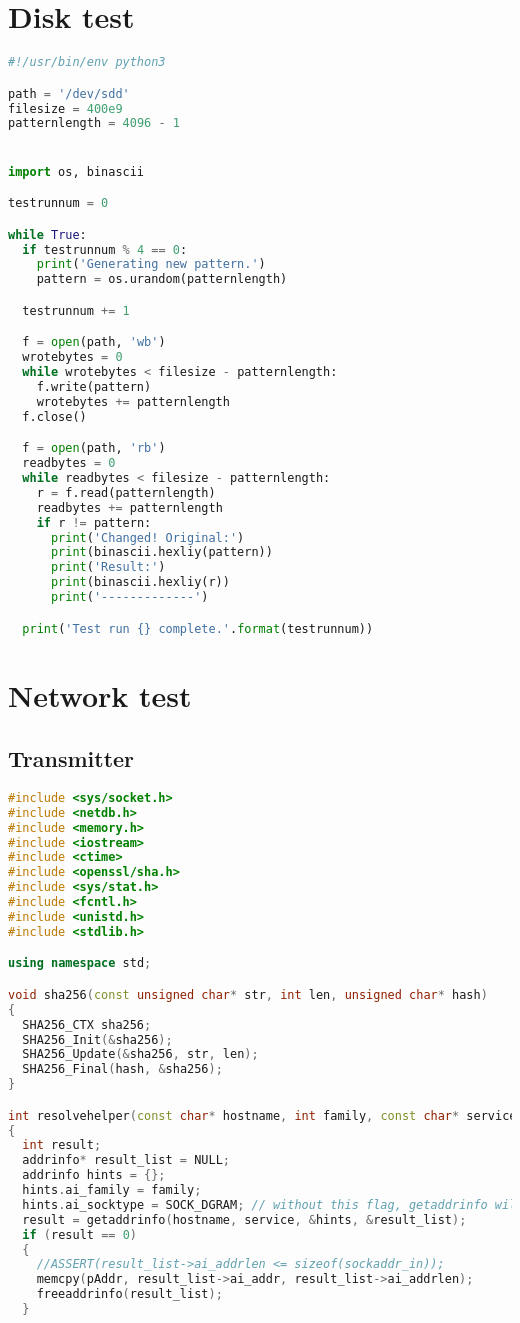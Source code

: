 \begin{appendices}
\section{Disk test}\label{Apdx-disk}
\begin{lstlisting}[language=Python]
#!/usr/bin/env python3

path = '/dev/sdd'
filesize = 400e9
patternlength = 4096 - 1


import os, binascii

testrunnum = 0

while True:
  if testrunnum % 4 == 0:
    print('Generating new pattern.')
    pattern = os.urandom(patternlength)

  testrunnum += 1

  f = open(path, 'wb')
  wrotebytes = 0
  while wrotebytes < filesize - patternlength:
    f.write(pattern)
    wrotebytes += patternlength
  f.close()

  f = open(path, 'rb')
  readbytes = 0
  while readbytes < filesize - patternlength:
    r = f.read(patternlength)
    readbytes += patternlength
    if r != pattern:
      print('Changed! Original:')
      print(binascii.hexliy(pattern))
      print('Result:')
      print(binascii.hexliy(r))
      print('-------------')

  print('Test run {} complete.'.format(testrunnum))
\end{lstlisting}

\section{Network test}\label{Apdx-network}
\subsection{Transmitter}
\begin{lstlisting}[language=C++]
#include <sys/socket.h>
#include <netdb.h>
#include <memory.h>
#include <iostream>
#include <ctime>
#include <openssl/sha.h>
#include <sys/stat.h>
#include <fcntl.h>
#include <unistd.h>
#include <stdlib.h>

using namespace std;

void sha256(const unsigned char* str, int len, unsigned char* hash)
{
  SHA256_CTX sha256;
  SHA256_Init(&sha256);
  SHA256_Update(&sha256, str, len);
  SHA256_Final(hash, &sha256);
}

int resolvehelper(const char* hostname, int family, const char* service, sockaddr_storage* pAddr)
{
  int result;
  addrinfo* result_list = NULL;
  addrinfo hints = {};
  hints.ai_family = family;
  hints.ai_socktype = SOCK_DGRAM; // without this flag, getaddrinfo will return 3x the number of addresses (one for each socket type).
  result = getaddrinfo(hostname, service, &hints, &result_list);
  if (result == 0)
  {
    //ASSERT(result_list->ai_addrlen <= sizeof(sockaddr_in));
    memcpy(pAddr, result_list->ai_addr, result_list->ai_addrlen);
    freeaddrinfo(result_list);
  }


\end{lstlisting}
\end{appendices}
